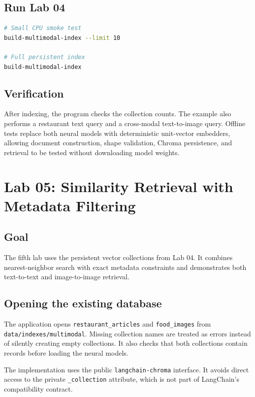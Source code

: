 \documentclass[11pt]{article}
\begin{document}
\subsection{Run Lab 04}

\begin{lstlisting}[language=bash]
# Small CPU smoke test
build-multimodal-index --limit 10

# Full persistent index
build-multimodal-index
\end{lstlisting}

\subsection{Verification}

After indexing, the program checks the collection counts. The example also
performs a restaurant text query and a cross-modal text-to-image query.
Offline tests replace both neural models with deterministic unit-vector
embedders, allowing document construction, shape validation, Chroma persistence,
and retrieval to be tested without downloading model weights.

\section{Lab 05: Similarity Retrieval with Metadata Filtering}

\subsection{Goal}

The fifth lab uses the persistent vector collections from Lab 04. It combines
nearest-neighbor search with exact metadata constraints and demonstrates both
text-to-text and image-to-image retrieval.

\subsection{Opening the existing database}

The application opens \texttt{restaurant\_articles} and
\texttt{food\_images} from \texttt{data/indexes/multimodal}. Missing collection
names are treated as errors instead of silently creating empty collections. It
also checks that both collections contain records before loading the neural
models.

The implementation uses the public \texttt{langchain-chroma} interface.
It avoids direct access to the private \texttt{\_collection} attribute, which
is not part of LangChain's compatibility contract.
\end{document}

